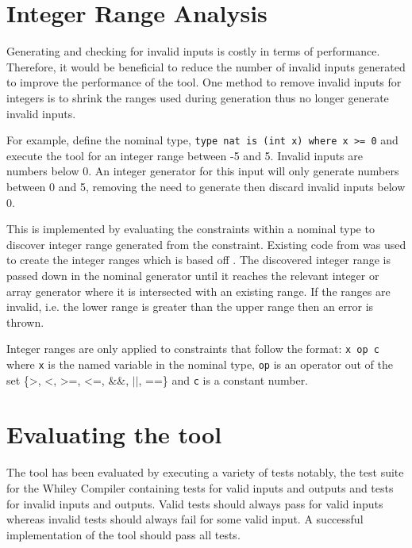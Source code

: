 \section{Integer Range Analysis}

Generating and checking for invalid inputs is costly in terms of performance. 
Therefore, it would be beneficial to reduce the number of invalid inputs generated to improve the performance of the tool.
One method to remove invalid inputs for integers is to shrink the ranges used during generation thus no longer generate invalid inputs.

For example, define the nominal type, \texttt{type nat is (int x) where x \textgreater= 0} and execute the tool for an integer range between -5 and 5. Invalid inputs are numbers below 0. An integer generator for this input will only generate numbers between 0 and 5, removing the need to generate then discard invalid inputs below 0.

This is implemented by evaluating the constraints within a nominal type to discover integer range generated from the constraint.
Existing code from \cite{whileyIntegerRangeCode} was used to create the integer ranges which is based off \cite{whileyIntegerRange}.
The discovered integer range is passed down in the nominal generator until it reaches the relevant integer or array generator where it is intersected with an existing range.
If the ranges are invalid, i.e. the lower range is greater than the upper range then an error is thrown.

Integer ranges are only applied to constraints that follow the format: \texttt{x op c} where \texttt{x} is the named variable in the nominal type, \texttt{op} is an operator out of the set \{\textgreater, \textless, \textgreater=, \textless=, \&\&, $||$, ==\} and \texttt{c} is a constant number.

\section{Evaluating the tool}
The tool has been evaluated by executing a variety of tests notably, the test suite for the Whiley Compiler containing tests for valid inputs and outputs and tests for invalid inputs and outputs. 
Valid tests should always pass for valid inputs whereas invalid tests should always fail for some valid input. 
A successful implementation of the tool should pass all tests.




